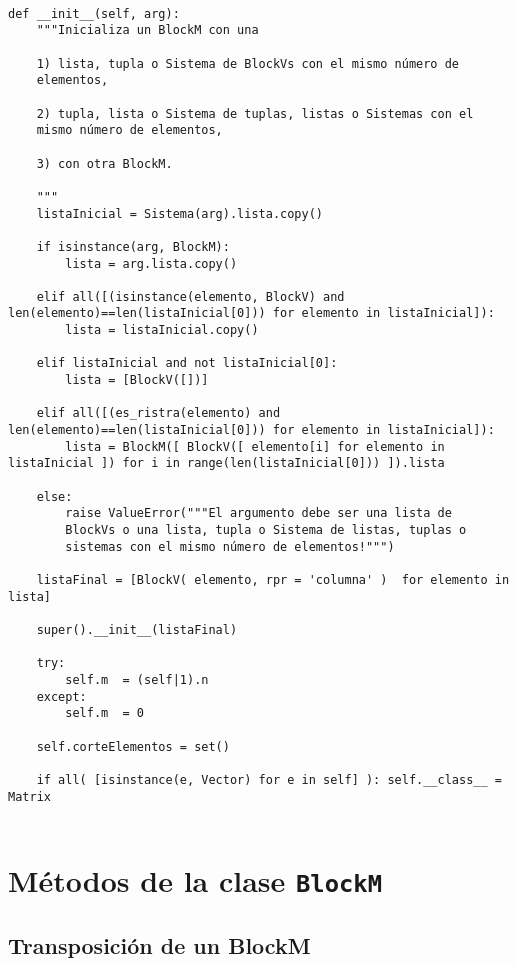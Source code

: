 \documentclass[11pt]{report}
\begin{document}
\begin{verbatim}

def __init__(self, arg):
    """Inicializa un BlockM con una

    1) lista, tupla o Sistema de BlockVs con el mismo número de
    elementos,
    
    2) tupla, lista o Sistema de tuplas, listas o Sistemas con el
    mismo número de elementos,
    
    3) con otra BlockM.

    """    
    listaInicial = Sistema(arg).lista.copy()

    if isinstance(arg, BlockM):
        lista = arg.lista.copy()
        
    elif all([(isinstance(elemento, BlockV) and len(elemento)==len(listaInicial[0])) for elemento in listaInicial]):
        lista = listaInicial.copy()

    elif listaInicial and not listaInicial[0]:
        lista = [BlockV([])]

    elif all([(es_ristra(elemento) and len(elemento)==len(listaInicial[0])) for elemento in listaInicial]):
        lista = BlockM([ BlockV([ elemento[i] for elemento in listaInicial ]) for i in range(len(listaInicial[0])) ]).lista

    else: 
        raise ValueError("""El argumento debe ser una lista de
        BlockVs o una lista, tupla o Sistema de listas, tuplas o
        sistemas con el mismo número de elementos!""")

    listaFinal = [BlockV( elemento, rpr = 'columna' )  for elemento in lista]

    super().__init__(listaFinal)

    try: 
        self.m  = (self|1).n
    except:
        self.m  = 0
            
    self.corteElementos = set()
           
    if all( [isinstance(e, Vector) for e in self] ): self.__class__ = Matrix
    
\end{verbatim}

\section{Métodos de la clase \texttt{BlockM}}
\label{sec:orgbbdaa52}
\subsection{Transposición de un BlockM}
\label{sec:org5c00629}
\end{document}
